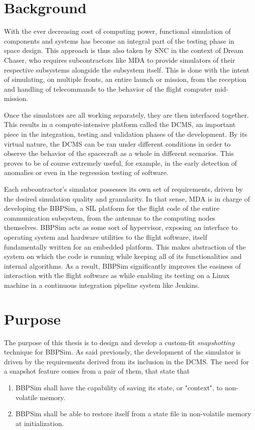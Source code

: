 \section{Background}
With the ever decreasing cost of computing power, functional simulation of components and systems has become an integral part of the testing phase in space design. This approach is thus also taken by \gls{SNC} in the context of Dream Chaser, who requires subcontractors like \gls{MDA} to provide simulators of their respective subsystems alongside the subsystem itself. This is done with the intent of simulating, on multiple fronts, an entire launch or mission, from the reception and handling of telecommands to the behavior of the flight computer mid-mission. 

Once the simulators are all working separately, they are then interfaced together. This results in a compute-intensive platform called the \gls{DCMS}, an important piece in the integration, testing and validation phases of the development. By its virtual nature, the \gls{DCMS} can be ran under different conditions in order to observe the behavior of the spacecraft as a whole in different scenarios. This proves to be of course extremely useful, for example, in the early detection of anomalies or even in the regression testing of software.

Each subcontractor's simulator possesses its own set of requirements, driven by the desired simulation quality and granularity. In that sense, \gls{MDA} is in charge of developing the \gls{BBPSim}, a \gls{SIL} platform for the flight code of the entire communication subsystem, from the antennas to the computing nodes themselves. \gls{BBPSim} acts as some sort of hypervisor, exposing an interface to operating system and hardware utilities to the flight software, itself fundamentally written for an embedded platform. This makes abstraction of the system on which the code is running while keeping all of its functionalities and internal algorithms. As a result, \gls{BBPSim} significantly improves the easiness of interaction with the flight software as while enabling its testing on a Linux machine in a continuous integration pipeline system like Jenkins.

\section{Purpose}
The purpose of this thesis is to design and develop a custom-fit \textit{snapshotting} technique for \gls{BBPSim}. As said previously, the development of the simulator is driven by the requirements derived from its inclusion in the DCMS. The need for a snapshot feature comes from a pair of them, that state that
\begin{enumerate}
	\item \gls{BBPSim} shall have the capability of saving its state, or "context", to non-volatile memory.
	\item \gls{BBPSim} shall be able to restore itself from a state file in non-volatile memory at initialization.
\end{enumerate} 

